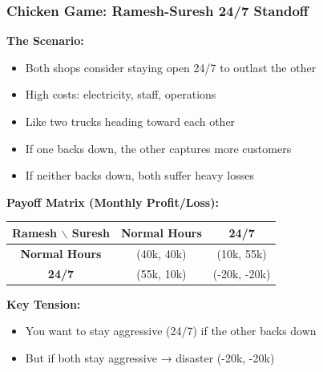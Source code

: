 \begin{frame}[fragile]\frametitle{Chicken Game: Ramesh-Suresh 24/7 Standoff}

\textbf{The Scenario:}
\begin{itemize}
  \item Both shops consider staying open 24/7 to outlast the other
  \item High costs: electricity, staff, operations
  \item Like two trucks heading toward each other
  \item If one backs down, the other captures more customers
  \item If neither backs down, both suffer heavy losses
\end{itemize}

\vspace{6pt}

\textbf{Payoff Matrix (Monthly Profit/Loss):}

\begin{center}
\begin{tabular}{|c|c|c|}
  \hline
  \textbf{Ramesh $\backslash$ Suresh} & \textbf{Normal Hours} & \textbf{24/7} \\
  \hline
  \textbf{Normal Hours} & (40k, 40k) & (10k, 55k) \\
  \hline
  \textbf{24/7} & (55k, 10k) & (-20k, -20k) \\
  \hline
\end{tabular}
\end{center}

\vspace{6pt}

\textbf{Key Tension:}
\begin{itemize}
  \item You want to stay aggressive (24/7) if the other backs down
  \item But if both stay aggressive → disaster (-20k, -20k)
\end{itemize}

\end{frame}


